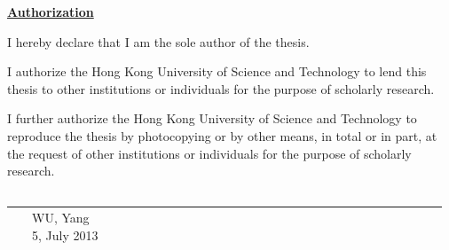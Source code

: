\begin{center}
{\bf \Large \underline{Authorization}}
\end{center}
\vspace{12mm}

I hereby declare that I am the sole author of the thesis.

\vspace{10mm}

I authorize the Hong Kong University of Science and Technology to lend this
thesis to other institutions or individuals for the purpose of scholarly research.

\vspace{10mm}

I further authorize the Hong Kong University of Science and Technology to
reproduce the thesis by photocopying or by other means, in total or in part, at the
request of other institutions or individuals for the purpose of scholarly research.

\vspace{30mm}

\begin{center}
\underline{~~~~~~~~~~~~~~~~~~~~~~~~~~~~~~~~~~~~~~~~~~~~~~~~~~~~~~~~~~~~~~~~~~~~~~}\\
~~~~WU, Yang \\
~~~~5, July 2013

\end{center}
